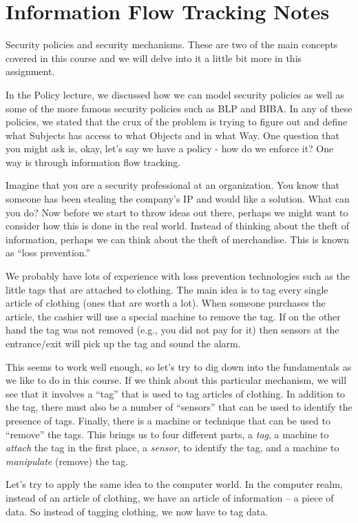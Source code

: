 \chapter{Information Flow Tracking Notes}

Security policies and security mechanisms. These are two of the main concepts covered in this course
and we will delve into it a little bit more in this assignment.

In the Policy lecture, we discussed how we can model security policies as well as some of the more
famous security policies such as BLP and BIBA. In any of these policies, we stated that the crux of the
problem is trying to figure out and define what Subjects has access to what Objects and in what Way.
One question that you might ask is, okay, let’s say we have a policy - how do we enforce it? One way is
through information flow tracking.

Imagine that you are a security professional at an organization. You know that someone has been
stealing the company’s IP and would like a solution. What can you do? Now before we start to throw
ideas out there, perhaps we might want to consider how this is done in the real world. Instead of
thinking about the theft of information, perhaps we can think about the theft of merchandise. This is
known as ``loss prevention.''

We probably have lots of experience with loss prevention technologies such as the little tags that are
attached to clothing. The main idea is to tag every single article of clothing (ones that are worth a lot).
When someone purchases the article, the cashier will use a special machine to remove the tag. If on the
other hand the tag was not removed (e.g., you did not pay for it) then sensors at the entrance/exit will
pick up the tag and sound the alarm.

This seems to work well enough, so let’s try to dig down into the fundamentals as we like to do in this
course. If we think about this particular mechanism, we will see that it involves a ``tag'' that is used to tag
articles of clothing. In addition to the tag, there must also be a number of ``sensors'' that can be used to
identify the presence of tags. Finally, there is a machine or technique that can be used to ``remove'' the
tags. This brings us to four different parts, a {\em tag}, a machine to {\em attach} the tag in the first place, a {\em sensor},
to identify the tag, and a machine to {\em manipulate} (remove) the tag.

Let’s try to apply the same idea to the computer world. In the computer realm, instead of an article of
clothing, we have an article of information -- a piece of data. So instead of tagging clothing, we now
have to tag data.

